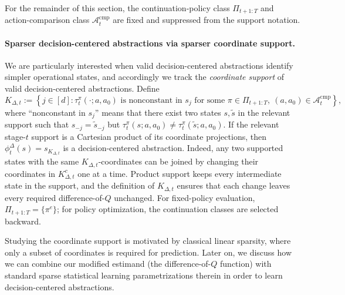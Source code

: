 \documentclass[opre,nonblindrev]{informs4}
\newenvironment{revision}{\begingroup\color{revisionblue}\ignorespaces}{\endgroup}
\newcommand{\blipadv}{\tau}
\begin{document}
\begin{revision}
For the remainder of this section, the continuation-policy class
$\Pi_{t+1:T}$ and action-comparison class $\mathcal A_t^{\mathrm{cmp}}$ are fixed and
suppressed from the support notation. 

\paragraph{Sparser decision-centered abstractions via sparser coordinate support.}
We are particularly interested when valid decision-centered abstractions identify simpler operational states, and accordingly we track the \textit{coordinate support} of valid decision-centered abstractions. Define
\begin{equation}
K_{\Delta,t}
:=
\left\{
    j\in[d]:
    \blipadv_t^\pi(\cdot;a,a_0)
    \text{ is nonconstant in }s_j
    \text{ for some }\pi\in\Pi_{t+1:T},\ (a,a_0)\in\mathcal A_t^{\mathrm{cmp}}
\right\},
\label{eq:decision-support}
\end{equation}
where ``nonconstant in $s_j$'' means that there exist two states
$s,\widetilde s$ in the relevant support such that
$s_{-j}=\widetilde s_{-j}$ but $\blipadv_t^\pi(s;a,a_0)
\neq
\blipadv_t^\pi(\widetilde s;a,a_0)$. If the relevant stage-$t$ support is a
Cartesian product of its coordinate projections, then
$\phi_t^\Delta(s)=s_{K_{\Delta,t}}$ is a decision-centered abstraction. Indeed,
any two supported states with the same $K_{\Delta,t}$-coordinates can be joined
by changing their coordinates in $K_{\Delta,t}^c$ one at a time. Product support
keeps every intermediate state in the support, and the definition of
$K_{\Delta,t}$ ensures that each change leaves every required difference-of-$Q$
unchanged.
For fixed-policy evaluation, $\Pi_{t+1:T}=\{\pi^e\}$; for policy
optimization, the continuation classes are selected backward. 

Studying the coordinate support is motivated by classical linear sparsity, where only a subset of coordinates is required for prediction. Later on, we discuss how we can combine our modified estimand (the difference-of-$Q$ function) with standard sparse statistical learning parametrizations therein in order to learn decision-centered abstractions. 





\end{revision}
\end{document}

